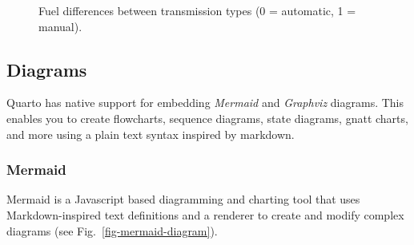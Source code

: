 \documentclass[
  letterpaper,
  DIV=11,
  numbers=noendperiod]{scrartcl}
\begin{document}
\begin{figure}


\caption{\label{fig-boxplot}Fuel differences between transmission types
(0 = automatic, 1 = manual).}

\end{figure}%

\subsection{Diagrams}\label{diagrams}

Quarto has native support for embedding \emph{Mermaid} and
\emph{Graphviz} diagrams. This enables you to create flowcharts,
sequence diagrams, state diagrams, gnatt charts, and more using a plain
text syntax inspired by markdown.

\subsubsection{Mermaid}\label{mermaid}

Mermaid is a Javascript based diagramming and charting tool that uses
Markdown-inspired text definitions and a renderer to create and modify
complex diagrams (see Fig.~\ref{fig-mermaid-diagram}).
\end{document}
